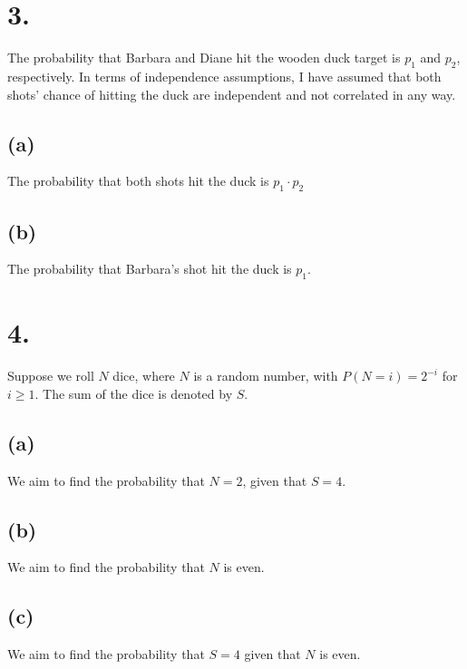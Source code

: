 \documentclass{article}
\begin{document}
{}

\section*{3.}
{\Large 
The probability that Barbara and Diane hit the wooden duck target is $p_1$ and $p_2$, respectively. 
In terms of independence assumptions, I have assumed that both shots' chance of hitting the duck are independent and not correlated in any way.

\subsection*{(a)}
The probability that both shots hit the duck is $p_1 \cdot p_2$

\subsection*{(b)}
The probability that Barbara's shot hit the duck is $p_1$. 

}

\section*{4.}
{\Large 
Suppose we roll $N$ dice, where $N$ is a random number, with $P(N = i) = 2^{-i}$ for $i \geq 1$. The sum of the dice is denoted by $S$.

\subsection*{(a)}
We aim to find the probability that $N = 2$, given that $S = 4$. 

\subsection*{(b)}
We aim to find the probability that $N$ is even.

\subsection*{(c)}
We aim to find the probability that $S = 4$ given that $N$ is even.

}
\end{document}
